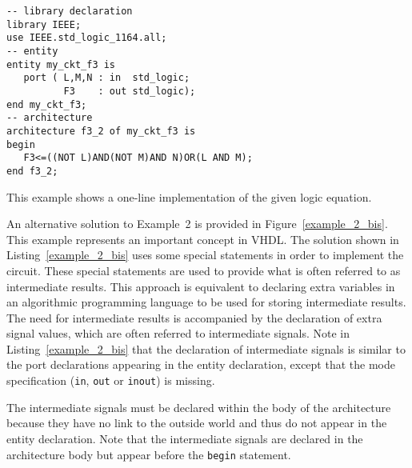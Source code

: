 \noindent
\begin{minipage}{0.6\linewidth}
\begin{lstlisting}[label=example_2, caption=Solution of Example~2.]
-- library declaration
library IEEE;
use IEEE.std_logic_1164.all;
-- entity
entity my_ckt_f3 is
   port ( L,M,N : in  std_logic;
          F3    : out std_logic);
end my_ckt_f3;
-- architecture
architecture f3_2 of my_ckt_f3 is
begin
   F3<=((NOT L)AND(NOT M)AND N)OR(L AND M);
end f3_2;
\end{lstlisting}
\end{minipage}
\begin{minipage}{0.4\linewidth}
\begin{flushright}
\end{flushright}
\end{minipage}

This example shows a one-line implementation of the given logic equation.

An alternative solution to Example~2 is provided in Figure~\ref{example_2_bis}. This example represents an important concept in VHDL. The solution shown in Listing~\ref{example_2_bis} uses some special statements in order to implement the circuit. These special statements are used to provide what is often referred to as intermediate results. This approach is equivalent to declaring extra variables in an algorithmic programming language to be used for storing intermediate results. The need for intermediate results is accompanied by the declaration of extra signal values, which are often referred to intermediate signals. Note in Listing~\ref{example_2_bis} that the declaration of intermediate signals is similar to the port declarations appearing in the entity declaration, except that the mode specification (\texttt{in}, \texttt{out} or \texttt{inout}) is missing.

The intermediate signals must be declared within the body of the architecture because they have no link to the outside world and thus do not appear in the entity declaration. Note that the intermediate signals are declared in the architecture body but appear before the \texttt{begin} statement.

